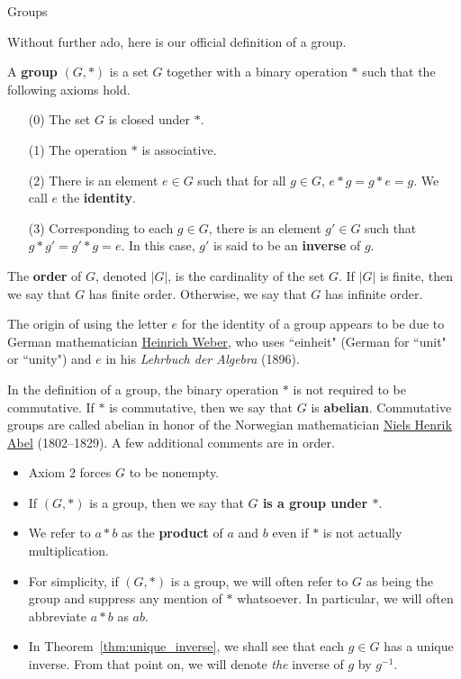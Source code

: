 \begin{section}{Groups}


Without further ado, here is our official definition of a group.

\begin{definition}\label{def:group}
A \textbf{group} $(G,*)$ is a set $G$ together with a binary operation $*$ such that the following axioms hold.
\begin{enumerate}
\item[(0)] The set $G$ is closed under $*$.
\item[(1)] The operation $*$ is associative.
\item[(2)] There is an element $e\in G$ such that for all $g\in G$, $e*g=g*e=g$.  We call $e$ the \textbf{identity}.
\item[(3)] Corresponding to each $g\in G$, there is an element $g'\in G$ such that $g*g'=g'*g=e$.  In this case, $g'$ is said to be an \textbf{inverse} of $g$.
\end{enumerate}
The \textbf{order} of $G$, denoted $|G|$, is the cardinality of the set $G$. If $|G|$ is finite, then we say that $G$ has finite order. Otherwise, we say that $G$ has infinite order.
\end{definition}

The origin of using the letter $e$ for the identity of a group appears to be due to German mathematician \href{https://en.wikipedia.org/wiki/Heinrich_Martin_Weber}{Heinrich Weber}, who uses ``einheit" (German for ``unit" or ``unity") and $e$ in his \emph{Lehrbuch der Algebra} (1896).

In the definition of a group, the binary operation $*$ is not required to be commutative.  If $*$ is commutative, then we say that $G$ is \textbf{abelian}. Commutative groups are called abelian in honor of the Norwegian mathematician \href{https://en.wikipedia.org/wiki/Niels_Henrik_Abel}{Niels Henrik Abel} (1802--1829). A few additional comments are in order.
\begin{itemize}
\item Axiom 2 forces $G$ to be nonempty.
\item If $(G,*)$ is a group, then we say that \textbf{$G$ is a group under $*$}.
\item We refer to $a*b$ as the \textbf{product} of $a$ and $b$ even if $*$ is not actually multiplication. 
\item For simplicity, if $(G,*)$ is a group, we will often refer to $G$ as being the group and suppress any mention of $*$ whatsoever.  In particular, we will often abbreviate $a*b$ as $ab$.
\item In Theorem~\ref{thm:unique_inverse}, we shall see that each $g\in G$ has a unique inverse.  From that point on, we will denote \emph{the} inverse of $g$ by $g^{-1}$.
\end{itemize}


\end{section}
